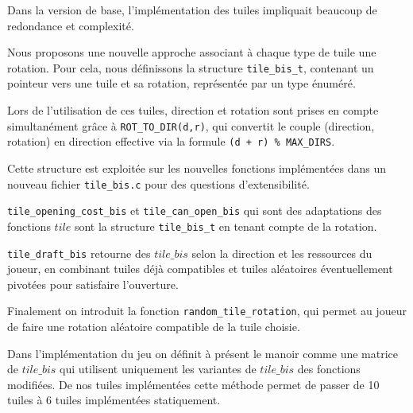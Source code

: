 
Dans la version de base, l’implémentation des tuiles impliquait beaucoup de redondance et complexité.

Nous proposons une nouvelle approche associant à chaque type de tuile une rotation. Pour cela, nous définissons la structure \texttt{tile\_bis\_t}, contenant un pointeur vers une tuile et sa rotation, représentée par un type énuméré.  

Lors de l’utilisation de ces tuiles, direction et rotation sont prises en compte simultanément grâce à \texttt{ROT\_TO\_DIR(d,r)}, qui convertit le couple (direction, rotation) en direction effective via la formule \texttt{(d + r) \% MAX\_DIRS}.  

Cette structure est exploitée sur les nouvelles fonctions implémentées dans un nouveau fichier \texttt{tile\_bis.c} pour des questions d'extensibilité.

\texttt{tile\_opening\_cost\_bis} et \texttt{tile\_can\_open\_bis} qui sont des adaptations des fonctions $tile$ sont la structure \texttt{tile\_bis\_t} en tenant compte de la rotation.

\texttt{tile\_draft\_bis} retourne des $tile\_bis$ selon la direction et les ressources du joueur, en combinant tuiles déjà compatibles et tuiles aléatoires éventuellement pivotées pour satisfaire l'ouverture.

Finalement on introduit la fonction \texttt{random\_tile\_rotation}, qui permet au joueur de faire une rotation aléatoire compatible de la tuile choisie.

Dans l'implémentation du jeu on définit à présent le manoir comme une matrice de $tile\_bis$ qui utilisent uniquement les variantes de $tile\_bis$ des fonctions modifiées. De nos tuiles implémentées cette méthode permet de passer de 10 tuiles à 6 tuiles implémentées statiquement.
